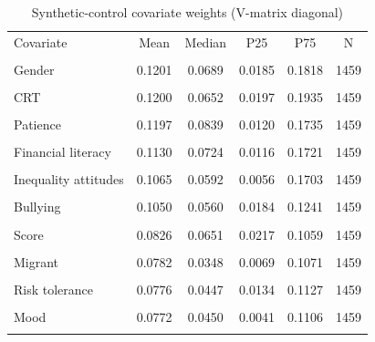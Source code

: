 \begin{table}[!htbp]
\centering
\caption{Synthetic-control covariate weights (V-matrix diagonal)}
\begin{tabular}{lccccc}
\hline
Covariate & Mean & Median & P25 & P75 & N \\\\
\hline
Gender &    0.1201 &    0.0689 &    0.0185 &    0.1818 &      1459 \\\\
CRT &    0.1200 &    0.0652 &    0.0197 &    0.1935 &      1459 \\\\
Patience &    0.1197 &    0.0839 &    0.0120 &    0.1735 &      1459 \\\\
Financial literacy &    0.1130 &    0.0724 &    0.0116 &    0.1721 &      1459 \\\\
Inequality attitudes &    0.1065 &    0.0592 &    0.0056 &    0.1703 &      1459 \\\\
Bullying &    0.1050 &    0.0560 &    0.0184 &    0.1241 &      1459 \\\\
Score &    0.0826 &    0.0651 &    0.0217 &    0.1059 &      1459 \\\\
Migrant &    0.0782 &    0.0348 &    0.0069 &    0.1071 &      1459 \\\\
Risk tolerance &    0.0776 &    0.0447 &    0.0134 &    0.1127 &      1459 \\\\
Mood &    0.0772 &    0.0450 &    0.0041 &    0.1106 &      1459 \\\\
\hline
\end{tabular}
\end{table}

